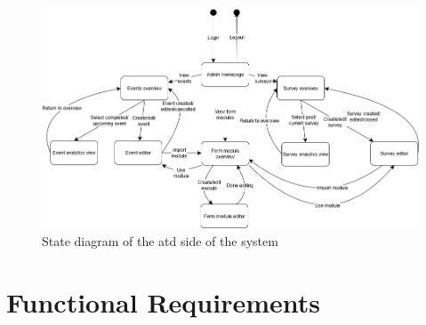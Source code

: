 \documentclass[12pt]{article}
\begin{document}
\begin{center}
\begin{figure}[H]
    \centering
    \includegraphics[width=1\linewidth]{images/state_diagram_attendee.png}
    \caption{State diagram of the \gls{atd} side of the system}\label{fig:stateattendee}
\end{figure}
\end{center}

\section{Functional Requirements}
\end{document}
